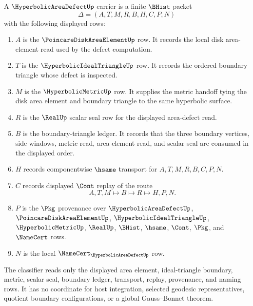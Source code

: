 \begin{definition}
\label{def:hyperbolic-area-defect-carrier}
A $\HyperbolicAreaDefectUp$ carrier is a finite $\BHist$ packet
$$
\Delta=(A,T,M,R,B,H,C,P,N)
$$
with the following displayed rows:
\begin{enumerate}
\item $A$ is the $\PoincareDiskAreaElementUp$ row. It records the local disk area-element read used by the defect computation.
\item $T$ is the $\HyperbolicIdealTriangleUp$ row. It records the ordered boundary triangle whose defect is inspected.
\item $M$ is the $\HyperbolicMetricUp$ row. It supplies the metric handoff tying the disk area element and boundary triangle to the same hyperbolic surface.
\item $R$ is the $\RealUp$ scalar seal row for the displayed area-defect read.
\item $B$ is the boundary-triangle ledger. It records that the three boundary vertices, side windows, metric read, area-element read, and scalar seal are consumed in the displayed order.
\item $H$ records componentwise $\hsame$ transport for $A,T,M,R,B,C,P,N$.
\item $C$ records displayed $\Cont$ replay of the route
$$
A,T,M \longmapsto B \longmapsto R \longmapsto H,P,N .
$$
\item $P$ is the $\Pkg$ provenance over $\HyperbolicAreaDefectUp$, $\PoincareDiskAreaElementUp$, $\HyperbolicIdealTriangleUp$, $\HyperbolicMetricUp$, $\RealUp$, $\BHist$, $\hsame$, $\Cont$, $\Pkg$, and $\NameCert$ rows.
\item $N$ is the local $\NameCert_{\HyperbolicAreaDefectUp}$ row.
\end{enumerate}
The classifier reads only the displayed area element, ideal-triangle boundary, metric, scalar seal, boundary ledger, transport, replay, provenance, and naming rows. It has no coordinate for host integration, selected geodesic representatives, quotient boundary configurations, or a global Gauss--Bonnet theorem.
\end{definition}

